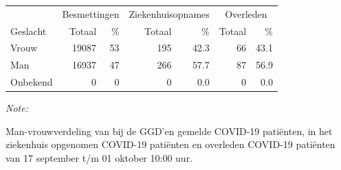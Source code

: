\documentclass[
  english,
  man,floatsintext]{apa6}
\begin{document}
\begin{table}[H]
\centering\begingroup\fontsize{11}{13}\selectfont

\begin{threeparttable}
\begin{tabular}{lrrrrrr}
\toprule
\multicolumn{1}{c}{ } & \multicolumn{2}{c}{Besmettingen} & \multicolumn{2}{c}{Ziekenhuisopnames} & \multicolumn{2}{c}{Overleden} \\
\cmidrule(l{3pt}r{3pt}){2-3} \cmidrule(l{3pt}r{3pt}){4-5} \cmidrule(l{3pt}r{3pt}){6-7}
Geslacht & Totaal & \% & Totaal & \% & Totaal & \%\\
\midrule
Vrouw & 19087 & 53 & 195 & 42.3 & 66 & 43.1\\
Man & 16937 & 47 & 266 & 57.7 & 87 & 56.9\\
Onbekend & 0 & 0 & 0 & 0.0 & 0 & 0.0\\
\bottomrule
\end{tabular}
\begin{tablenotes}
\item \textit{Note: } 
\item Man-vrouwverdeling van bij de GGD’en gemelde COVID-19 patiënten, in het ziekenhuis opgenomen COVID-19 patiënten en overleden COVID-19 patiënten van 17 september t/m 01 oktober 10:00 uur.
\end{tablenotes}
\end{threeparttable}
\endgroup{}
\end{table}
\newpage
\end{document}
